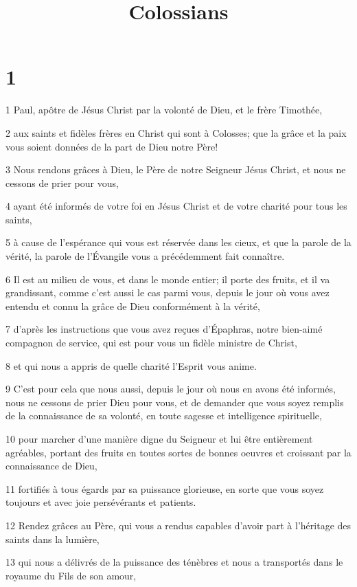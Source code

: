 

\title{Colossians}


\chapter{1}

\par 1 Paul, apôtre de Jésus Christ par la volonté de Dieu, et le frère Timothée,
\par 2 aux saints et fidèles frères en Christ qui sont à Colosses; que la grâce et la paix vous soient données de la part de Dieu notre Père!
\par 3 Nous rendons grâces à Dieu, le Père de notre Seigneur Jésus Christ, et nous ne cessons de prier pour vous,
\par 4 ayant été informés de votre foi en Jésus Christ et de votre charité pour tous les saints,
\par 5 à cause de l'espérance qui vous est réservée dans les cieux, et que la parole de la vérité, la parole de l'Évangile vous a précédemment fait connaître.
\par 6 Il est au milieu de vous, et dans le monde entier; il porte des fruits, et il va grandissant, comme c'est aussi le cas parmi vous, depuis le jour où vous avez entendu et connu la grâce de Dieu conformément à la vérité,
\par 7 d'après les instructions que vous avez reçues d'Épaphras, notre bien-aimé compagnon de service, qui est pour vous un fidèle ministre de Christ,
\par 8 et qui nous a appris de quelle charité l'Esprit vous anime.
\par 9 C'est pour cela que nous aussi, depuis le jour où nous en avons été informés, nous ne cessons de prier Dieu pour vous, et de demander que vous soyez remplis de la connaissance de sa volonté, en toute sagesse et intelligence spirituelle,
\par 10 pour marcher d'une manière digne du Seigneur et lui être entièrement agréables, portant des fruits en toutes sortes de bonnes oeuvres et croissant par la connaissance de Dieu,
\par 11 fortifiés à tous égards par sa puissance glorieuse, en sorte que vous soyez toujours et avec joie persévérants et patients.
\par 12 Rendez grâces au Père, qui vous a rendus capables d'avoir part à l'héritage des saints dans la lumière,
\par 13 qui nous a délivrés de la puissance des ténèbres et nous a transportés dans le royaume du Fils de son amour,
